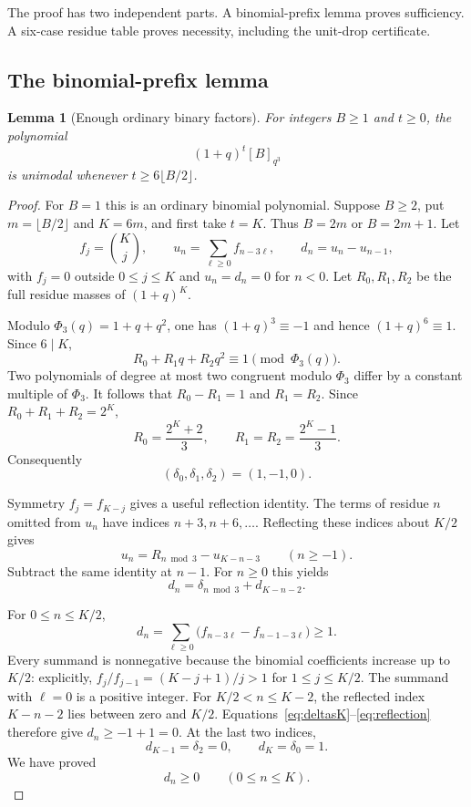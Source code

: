 \documentclass[11pt]{article}
\theoremstyle{research}
\newtheorem{lemma}[theorem]{Lemma}
\theoremstyle{definition}
\newcommand{\qir}[2]{[#1]_{q^{#2}}}
\numberwithin{equation}{section}
\begin{document}
The proof has two independent parts. A binomial-prefix lemma proves
sufficiency. A six-case residue table proves necessity, including the
unit-drop certificate.

\subsection{The binomial-prefix lemma}
\begin{lemma}[Enough ordinary binary factors]\label{lem:binomialcomb}
For integers $B\ge1$ and $t\ge0$, the polynomial
\[
 (1+q)^t\qir B3
\]
is unimodal whenever $t\ge6\lfloor B/2\rfloor$.
\end{lemma}
\begin{proof}
For $B=1$ this is an ordinary binomial polynomial. Suppose $B\ge2$,
put $m=\lfloor B/2\rfloor$ and $K=6m$, and first take $t=K$.
Thus $B=2m$ or $B=2m+1$.
Let
\[
 f_j=\binom Kj,\qquad
 u_n=\sum_{\ell\ge0}f_{n-3\ell},\qquad d_n=u_n-u_{n-1},
\]
with $f_j=0$ outside $0\le j\le K$ and $u_n=d_n=0$ for $n<0$.
Let $R_0,R_1,R_2$ be the full residue masses of $(1+q)^K$.

Modulo $\Phi_3(q)=1+q+q^2$, one has $(1+q)^3\equiv-1$ and hence
$(1+q)^6\equiv1$. Since $6\mid K$,
\[
 R_0+R_1q+R_2q^2\equiv1\pmod{\Phi_3(q)}.
\]
Two polynomials of degree at most two congruent modulo $\Phi_3$ differ
by a constant multiple of $\Phi_3$. It follows that $R_0-R_1=1$ and
$R_1=R_2$. Since $R_0+R_1+R_2=2^K$,
\begin{equation}\label{eq:binomialresidues}
 R_0=\frac{2^K+2}{3},\qquad
 R_1=R_2=\frac{2^K-1}{3}.
\end{equation}
Consequently
\begin{equation}\label{eq:deltasK}
 (\delta_0,\delta_1,\delta_2)=(1,-1,0).
\end{equation}

Symmetry $f_j=f_{K-j}$ gives a useful reflection identity.
The terms of residue $n$ omitted from $u_n$ have indices
$n+3,n+6,\ldots$. Reflecting these indices about $K/2$ gives
\[
 u_n=R_{n\bmod3}-u_{K-n-3}\qquad(n\ge-1).
\]
Subtract the same identity at $n-1$. For $n\ge0$ this yields
\begin{equation}\label{eq:reflection}
 d_n=\delta_{n\bmod3}+d_{K-n-2}.
\end{equation}

For $0\le n\le K/2$,
\[
 d_n=\sum_{\ell\ge0}\bigl(f_{n-3\ell}-f_{n-1-3\ell}\bigr)\ge1.
\]
Every summand is nonnegative because the binomial coefficients increase
up to $K/2$: explicitly, $f_j/f_{j-1}=(K-j+1)/j>1$ for
$1\le j\le K/2$. The summand with $\ell=0$ is a positive integer.
For $K/2<n\le K-2$, the reflected index $K-n-2$ lies between zero and
$K/2$. Equations~\eqref{eq:deltasK}--\eqref{eq:reflection} therefore give
$d_n\ge-1+1=0$.
At the last two indices,
\[
 d_{K-1}=\delta_2=0,\qquad d_K=\delta_0=1.
\]
We have proved
\begin{equation}\label{eq:prefixmonotone}
 d_n\ge0\qquad(0\le n\le K).
\end{equation}


\end{proof}
\end{document}
